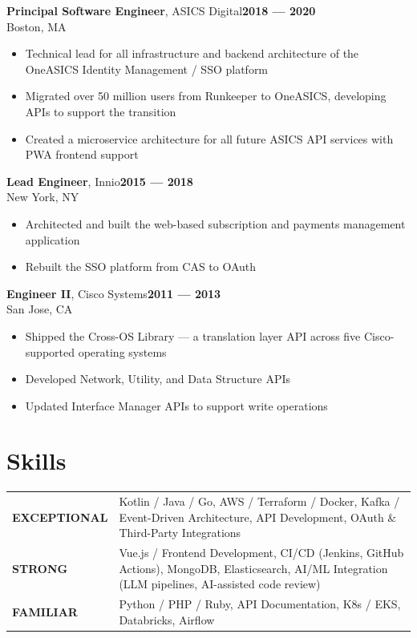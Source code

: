 \documentclass[11pt,letterpaper]{article}
\begin{document}
\vspace{6pt}
{\seriffont\fontsize{13}{16}\selectfont\bfseries Principal Software Engineer}{\color{muted}, ASICS Digital}\hfill{\small\color{accent}\bfseries 2018 --- 2020}\\
{\small\color{muted}Boston, MA}
\begin{itemize}
  \item Technical lead for all infrastructure and backend architecture of the OneASICS Identity Management / SSO platform
  \item Migrated over 50 million users from Runkeeper to OneASICS, developing APIs to support the transition
  \item Created a microservice architecture for all future ASICS API services with PWA frontend support
\end{itemize}

\vspace{6pt}
{\seriffont\fontsize{13}{16}\selectfont\bfseries Lead Engineer}{\color{muted}, Innio}\hfill{\small\color{accent}\bfseries 2015 --- 2018}\\
{\small\color{muted}New York, NY}
\begin{itemize}
  \item Architected and built the web-based subscription and payments management application
  \item Rebuilt the SSO platform from CAS to OAuth
\end{itemize}

\vspace{6pt}
{\seriffont\fontsize{13}{16}\selectfont\bfseries Engineer II}{\color{muted}, Cisco Systems}\hfill{\small\color{accent}\bfseries 2011 --- 2013}\\
{\small\color{muted}San Jose, CA}
\begin{itemize}
  \item Shipped the Cross-OS Library --- a translation layer API across five Cisco-supported operating systems
  \item Developed Network, Utility, and Data Structure APIs
  \item Updated Interface Manager APIs to support write operations
\end{itemize}

\section{Skills}

\begin{tabularx}{\textwidth}{@{}lX@{}}
  \textbf{\small\color{accent}EXCEPTIONAL} & Kotlin / Java / Go, AWS / Terraform / Docker, Kafka / Event-Driven Architecture, API Development, OAuth \& Third-Party Integrations\\[3pt]
  \textbf{\small\color{accent}STRONG} & Vue.js / Frontend Development, CI/CD (Jenkins, GitHub Actions), MongoDB, Elasticsearch, AI/ML Integration (LLM pipelines, AI-assisted code review)\\[3pt]
  \textbf{\small\color{accent}FAMILIAR} & Python / PHP / Ruby, API Documentation, K8s / EKS, Databricks, Airflow\\
\end{tabularx}
\end{document}
